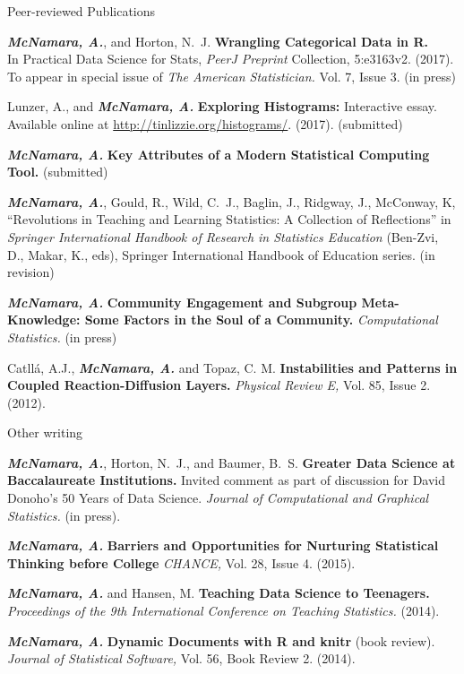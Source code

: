 \documentclass{resume} %
\begin{document}

\begin{rSection}{Peer-reviewed Publications}

{\bf \em{McNamara, A.}}, and Horton, N.~J. { \bf Wrangling Categorical Data in R. } 
\\In Practical Data Science for Stats, {\em PeerJ Preprint} Collection, 5:e3163v2. (2017).  
\\
To appear in special issue of {\em The American Statistician.} Vol. 7, Issue 3. (in press)

Lunzer, A., and {\bf \em McNamara, A.} {\bf Exploring Histograms:} Interactive essay. Available online at \url{http://tinlizzie.org/histograms/}. (2017). (submitted)

{\bf \em{McNamara, A.}} {\bf Key Attributes of a Modern Statistical Computing Tool. } (submitted)



{\bf \em McNamara, A.}, Gould, R., Wild, C.~J., Baglin, J., Ridgway, J., McConway, K, ``Revolutions in Teaching and Learning Statistics: A Collection of Reflections'' in {\em Springer International Handbook of Research in Statistics Education} (Ben-Zvi, D., Makar, K., eds), Springer International Handbook of Education series. (in revision) 

{\bf \em McNamara, A.} {\bf Community Engagement and Subgroup Meta-Knowledge: Some Factors in the Soul of a Community.} { \em Computational Statistics.} (in press)

{Catll{\'a}, A.J., {\bf \em McNamara, A.} and Topaz, C. M. } {\bf Instabilities and Patterns in Coupled Reaction-Diffusion Layers.} {\em Physical Review E,} Vol. 85, Issue 2. (2012). 

\end{rSection}



\begin{rSection}{Other writing}

{\bf \em McNamara, A.}, Horton, N.~J., and Baumer, B.~S. {\bf Greater Data Science at Baccalaureate Institutions.} Invited comment as part of discussion for David Donoho's 50 Years of Data Science. {\em Journal of Computational and Graphical Statistics.} (in press).


{\bf \em McNamara, A.} {\bf Barriers and Opportunities for Nurturing Statistical Thinking before College}{ \em CHANCE,} Vol. 28, Issue 4. (2015).

{\bf \em McNamara, A. }and Hansen, M. {\bf Teaching Data Science to Teenagers.}{ \em Proceedings of the 9th International Conference on Teaching Statistics.} (2014). 

{\bf \em McNamara, A. }{\bf Dynamic Documents with R and knitr} (book review). {\em Journal of Statistical Software,}{ Vol. 56, Book Review 2.} (2014).
\end{rSection}
\end{document}
